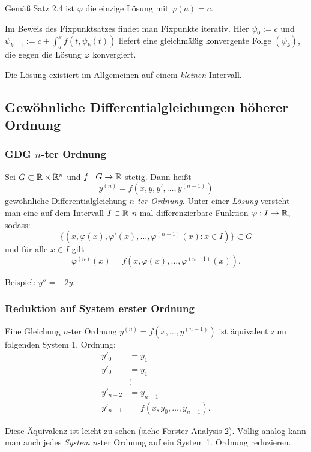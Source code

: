 \begin{rmrk}
  Gemäß Satz 2.4 ist $\varphi$ die einzige Lösung mit $\varphi(a) = c$.

  Im Beweis des Fixpunktsatzes findet man Fixpunkte iterativ. Hier $\psi_0 := c$
  und $\psi_{k+1}:= c + \int_a^x f(t,\psi_k(t))$ liefert eine gleichmäßig
  konvergente Folge $(\psi_k)$, die gegen die Lösung $\varphi$ konvergiert.

  Die Lösung existiert im Allgemeinen auf einem \emph{kleinen} Intervall.
\end{rmrk}

\subsection{Gewöhnliche Differentialgleichungen höherer Ordnung}
\subsubsection{GDG \texorpdfstring{$n$}{n}-ter Ordnung}

\begin{defn}
  Sei $G \subset \mathbb{R} \times \mathbb{R}^n$ und $f:G \to \mathbb{R}$ stetig. Dann heißt
  \[ y^{(n)} = f(x,y,y',\ldots, y^{(n-1)})\]
  gewöhnliche Differentialgleichung \emph{$n$-ter Ordnung}. Unter einer
  \emph{Lösung} versteht man eine auf dem Intervall $I \subset \mathbb{R}$ $n$-mal
  differenzierbare Funktion $\varphi: I \to \mathbb{R}$, sodass:
  \[ \{ (x, \varphi(x), \varphi'(x), \ldots, \varphi^{(n-1)}(x):x \in I) \}
    \subset G \]
  und für alle $x \in I$ gilt
  \[ \varphi^{(n)}(x) = f(x,\varphi(x), \ldots, \varphi^{(n-1)}(x)). \]
\end{defn}

Beispiel: $y'' = -2y$.

\subsubsection{Reduktion auf System erster Ordnung}
Eine Gleichung $n$-ter Ordnung $y^{(n)} = f(x, \ldots, y^{(n-1)})$ ist äquivalent
zum folgenden System 1. Ordnung:
\begin{align*}
  y'_0 &= y_1 \\
  y'_0 &= y_1 \\
       &\vdots \\
  y'_{n-2} &= y_{n-1} \\
  y'_{n-1} &= f(x,y_0,\ldots, y_{n-1}).
\end{align*}

Diese Äquivalenz ist leicht zu sehen (siehe Forster Analysis 2). Völlig analog
kann man auch jedes \emph{System} $n$-ter Ordnung auf ein System 1. Ordnung
reduzieren.

